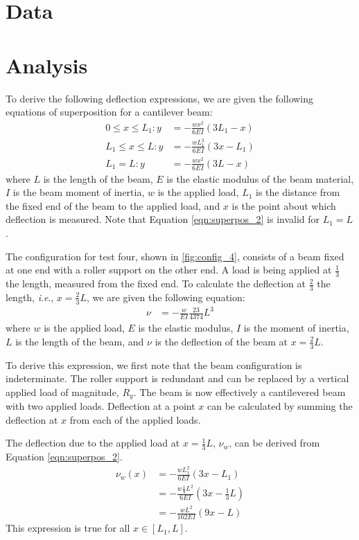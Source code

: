 \documentclass[12 pt]{article}
\newcommand{\ie}{\textit{i}.\textit{e}., }
\begin{document}
\section{Data} \label{data}

\section{Analysis} \label{analysis}
To derive the following deflection expressions, we are given the following equations of superposition for a cantilever beam:
\begin{align}
	0\le{}x\le{}L_1:y&=-\frac{wx^2}{6EI}(3L_1-x)\label{eqn:superpos_1}\\
	L_1\le{}x\le{}L:y&=-\frac{wL_1^2}{6EI}(3x-L_1)\label{eqn:superpos_2}\\
	L_1=L:y&=-\frac{wx^2}{6EI}(3L-x)\label{eqn:superpos_3}
\end{align}
where $L$ is the length of the beam, $E$ is the elastic modulus of the beam material, $I$ is the beam moment of inertia, $w$ is the applied load, $L_1$ is the distance from the fixed end of the beam to the applied load, and $x$ is the point about which deflection is measured. Note that Equation \ref{eqn:superpos_2} is invalid for $L_1=L$.

The configuration for test four, shown in \ref{fig:config_4}, consists of a beam fixed at one end with a roller support on the other end. A load is being applied at $\frac{1}{3}$ the length, measured from the fixed end. To calculate the deflection at $\frac{2}{3}$ the length, \ie $x=\frac{2}{3}L$, we are given the following equation:
\begin{align} \label{eqn:config_4-deflection}
	\nu&=-\frac{w}{EI}\frac{23}{4374}L^3
\end{align}
where $w$ is the applied load, $E$ is the elastic modulus, $I$ is the moment of inertia, $L$ is the length of the beam, and $\nu$ is the deflection of the beam at $x=\frac{2}{3}L$.

To derive this expression, we first note that the beam configuration is indeterminate. The roller support is redundant and can be replaced by a vertical applied load of magnitude, $R_y$. The beam is now effectively a cantilevered beam with two applied loads. Deflection at a point $x$ can be calculated by summing the deflection at $x$ from each of the applied loads.

The deflection due to the applied load at $x=\frac{1}{3}L$, $\nu_w$, can be derived from Equation \ref{eqn:superpos_2}.
\begin{align*}
	\nu_w(x)&=-\frac{wL_1^2}{6EI}(3x-L_1)\\
	&=-\frac{w\frac{1}{9}L^2}{6EI}(3x-\frac{1}{3}L)\\
	&=-\frac{wL^2}{162EI}(9x-L)
\end{align*}
This expression is true for all $x\in[L_1,L]$.
\end{document}
